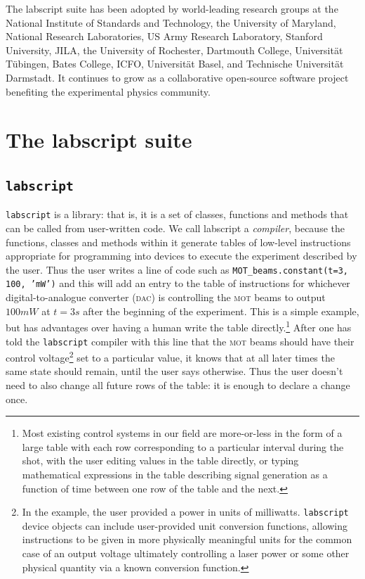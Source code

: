 The labscript suite has been adopted by world-leading research groups at the National Institute of Standards and Technology, the University of Maryland, National Research Laboratories, US Army Research Laboratory, Stanford University, JILA, the University of Rochester, Dartmouth College, Universit\"at T\"ubingen, Bates College, ICFO, Universit\"at Basel, and Technische Universit\"at Darmstadt. It continues to grow as a collaborative open-source software project benefiting the experimental physics community.


\section{The labscript suite}


\subsection{\texttt{labscript}}

\texttt{labscript} is a library: that is, it is a set of classes, functions and methods that can be called from user-written code. We call labscript a \emph{compiler}, because the functions, classes and methods within it generate tables of low-level instructions appropriate for programming into devices to execute the experiment described by the user. Thus the user writes a line of code such as \hbox{\texttt{MOT\_beams.constant(t=3, 100, 'mW')}} and this will add an entry to the table of instructions for whichever digital-to-analogue converter (\textsc{dac}) is controlling the \textsc{mot} beams to output $100\unit{mW}$ at $t = 3\unit{s}$ after the beginning of the experiment. This is a simple example, but has advantages over having a human write the table directly.\footnote{Most existing control systems in our field are more-or-less in the form of a large table with each row corresponding to a particular interval during the shot, with the user editing values in the table directly, or typing mathematical expressions in the table describing signal generation as a function of time between one row of the table and the next.} After one has told the \texttt{labscript} compiler with this line that the \textsc{mot} beams should have their control voltage\footnote{In the example, the user provided a power in units of milliwatts. \texttt{labscript} device objects can include user-provided unit conversion functions, allowing instructions to be given in more physically meaningful units for the common case of an output voltage ultimately controlling a laser power or some other physical quantity via a known conversion function.} set to a particular value, it knows that at all later times the same state should remain, until the user says otherwise. Thus the user doesn't need to also change all future rows of the table: it is enough to declare a change once. 

